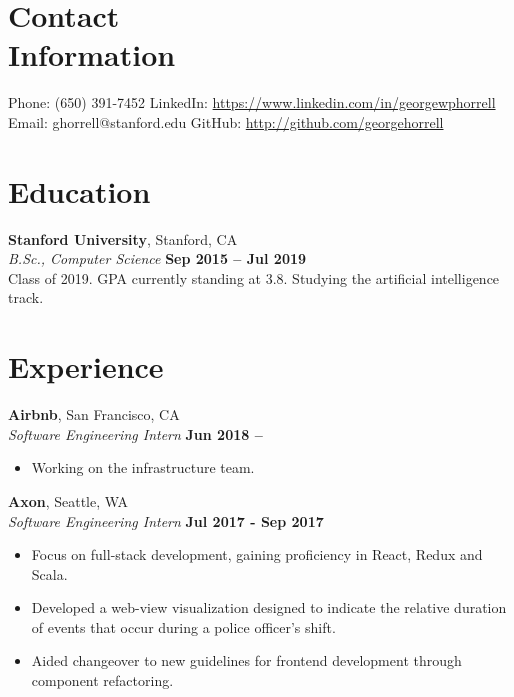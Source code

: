 \documentclass[margin,line]{resume}
\begin{document}
\begin{resume}
    \section{\mysidestyle Contact\\Information}

    Phone: (650) 391-7452       \hfill LinkedIn: \url{https://www.linkedin.com/in/georgewphorrell} \\
    \noindent Email: ghorrell@stanford.edu  \hfill GitHub: \url{http://github.com/georgehorrell} \vspace{0mm}\\\vspace{-4.5mm}

    \section{\mysidestyle Education}

    \textbf{Stanford University}, Stanford, CA \vspace{2mm}\\\vspace{1mm}%
    \textsl{B.Sc., Computer Science} \hfill \textbf{Sep 2015 -- Jul 2019}\\
    Class of 2019. GPA currently standing at 3.8. Studying the artificial intelligence track.

    \section{\mysidestyle Experience}
    
    \textbf{Airbnb}, San Francisco, CA \vspace{2mm}\\\vspace{1mm}%
    \textsl{Software Engineering Intern} \hfill \textbf{Jun 2018 --}
    \begin{itemize}
	\setlength\itemsep{-0.05em}
        \item Working on the infrastructure team.
	\end{itemize}
    
    \textbf{Axon}, Seattle, WA \vspace{2mm}\\\vspace{1mm}%
    \textsl{Software Engineering Intern} \hfill \textbf{Jul 2017 - Sep 2017}
    \begin{itemize}
	\setlength\itemsep{-0.05em}
        \item Focus on full-stack development, gaining proficiency in React, Redux and Scala. 
	    \item Developed a web-view visualization designed to indicate the relative duration of events that occur during a police officer's shift.
        \item Aided changeover to new guidelines for frontend development through component refactoring.
	\end{itemize}
    

\end{resume}
\end{document}
